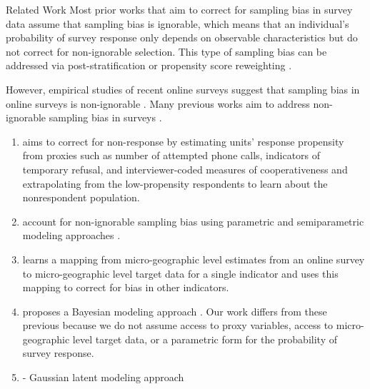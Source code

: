 \begin{subsection}{Related Work} 
	Most prior works that aim to correct for sampling bias in survey data assume that sampling bias is ignorable, which means that an individual's probability of survey response only depends on observable characteristics but do not correct for non-ignorable selection. This type of sampling bias can be addressed via post-stratification \citep{groves2008impact, groves2011survey, little1993post}  or propensity score reweighting \citep{david1983imputation,rosenbaum1983central,seaman2013review}.

	However, empirical studies of recent online surveys suggest that sampling bias in online surveys is non-ignorable \citep{bradley2021unrepresentative, kessler2022estimated}. Many previous works aim to address non-ignorable sampling bias in surveys \citep{andridge2011proxy, andridge2019indices, greenlees1982imputation, little2020measures, manski2016credible, qin2002estimation, peress2010correcting, reitsma2022bias, wisniowski2020integrating}. 

\begin{enumerate}
    \item \citet{peress2010correcting} aims to correct for non-response by estimating units' response propensity from proxies such as number of attempted phone calls, indicators of temporary refusal, and interviewer-coded measures of cooperativeness and extrapolating from the low-propensity respondents to learn about the nonrespondent population. 

    \item \citet{greenlees1982imputation,qin2002estimation} account for non-ignorable sampling bias using parametric and semiparametric modeling approaches . 

    \item \citet{reitsma2022bias} learns a mapping from micro-geographic level estimates from an online survey to micro-geographic level target data for a single indicator and uses this mapping to correct for bias in other indicators. 

    \item \citet{wisniowski2020integrating} proposes a Bayesian modeling approach . Our work differs from these previous because we do not assume access to proxy variables, access to micro-geographic level target data, or a parametric form for the probability of survey response.

    \item \citet{andridge2011proxy,andridge2019indices,little2020measures} - Gaussian latent modeling approach


\end{enumerate}
\end{subsection}
